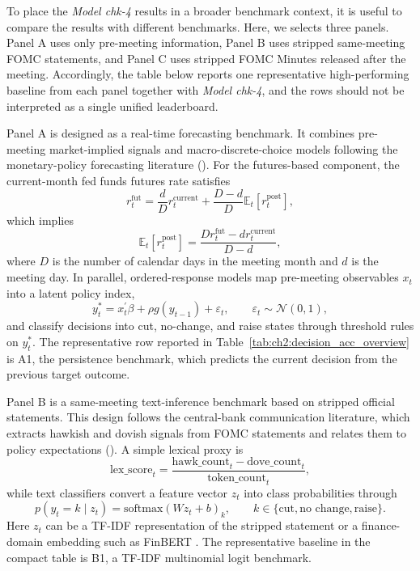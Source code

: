 To place the \textit{Model chk-4} results in a broader benchmark context, it is useful to compare the results with different benchmarks. Here, we selects three panels. Panel A uses only pre-meeting information, Panel B uses stripped same-meeting FOMC statements, and Panel C uses stripped FOMC Minutes released after the meeting. Accordingly, the table below reports one representative high-performing baseline from each panel together with \textit{Model chk-4}, and the rows should not be interpreted as a single unified leaderboard.


Panel A is designed as a real-time forecasting benchmark. It combines pre-meeting market-implied signals and macro-discrete-choice models following the monetary-policy forecasting literature (\cite{kuttner2001monetary,hamiltonjorda2002target}). For the futures-based component, the current-month fed funds futures rate satisfies
\begin{equation}
r_t^{\mathrm{fut}}=\frac{d}{D}r_t^{\mathrm{current}}+\frac{D-d}{D}\mathbb{E}_t\left[r_t^{\mathrm{post}}\right],
\end{equation}
which implies
\begin{equation}
\mathbb{E}_t\left[r_t^{\mathrm{post}}\right]=\frac{D r_t^{\mathrm{fut}}-d r_t^{\mathrm{current}}}{D-d},
\end{equation}
where $D$ is the number of calendar days in the meeting month and $d$ is the meeting day. In parallel, ordered-response models map pre-meeting observables $x_t$ into a latent policy index,
\begin{equation}
y_t^*=x_t^\prime\beta+\rho g(y_{t-1})+\varepsilon_t,\qquad \varepsilon_t\sim\mathcal{N}(0,1),
\end{equation}
and classify decisions into cut, no-change, and raise states through threshold rules on $y_t^*$. The representative row reported in Table~\ref{tab:ch2:decision_acc_overview} is A1, the persistence benchmark, which predicts the current decision from the previous target outcome.


Panel B is a same-meeting text-inference benchmark based on stripped official statements. This design follows the central-bank communication literature, which extracts hawkish and dovish signals from FOMC statements and relates them to policy expectations (\cite{luccatrebbi2009communication,gurkaynak2005actions}). A simple lexical proxy is
\begin{equation}
\text{lex\_score}_t=\frac{\text{hawk\_count}_t-\text{dove\_count}_t}{\text{token\_count}_t},
\end{equation}
while text classifiers convert a feature vector $z_t$ into class probabilities through
\begin{equation}
p(y_t=k\mid z_t)=\mathrm{softmax}(Wz_t+b)_k,\qquad k\in\{\text{cut},\text{no change},\text{raise}\}.
\end{equation}
Here $z_t$ can be a TF-IDF representation of the stripped statement or a finance-domain embedding such as FinBERT \cite{araci2019finbert}. The representative baseline in the compact table is B1, a TF-IDF multinomial logit benchmark.


